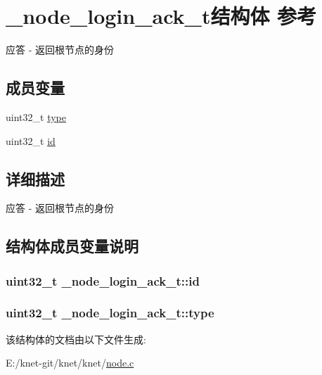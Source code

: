 \hypertarget{a00037}{}\section{\+\_\+node\+\_\+login\+\_\+ack\+\_\+t结构体 参考}
\label{a00037}


应答 -\/ 返回根节点的身份  


\subsection*{成员变量}
\begin{DoxyCompactItemize}
\item 
uint32\+\_\+t \hyperlink{a00037_aa36693af643bf1dfd76fd9192b84859d_aa36693af643bf1dfd76fd9192b84859d}{type}
\item 
uint32\+\_\+t \hyperlink{a00037_ad6b2a4f14df04a88e2b5f40978093056_ad6b2a4f14df04a88e2b5f40978093056}{id}
\end{DoxyCompactItemize}


\subsection{详细描述}
应答 -\/ 返回根节点的身份 

\subsection{结构体成员变量说明}
\hypertarget{a00037_ad6b2a4f14df04a88e2b5f40978093056_ad6b2a4f14df04a88e2b5f40978093056}{}
\subsubsection[{id}]{\setlength{\rightskip}{0pt plus 5cm}uint32\+\_\+t \+\_\+node\+\_\+login\+\_\+ack\+\_\+t\+::id}\label{a00037_ad6b2a4f14df04a88e2b5f40978093056_ad6b2a4f14df04a88e2b5f40978093056}
\hypertarget{a00037_aa36693af643bf1dfd76fd9192b84859d_aa36693af643bf1dfd76fd9192b84859d}{}
\subsubsection[{type}]{\setlength{\rightskip}{0pt plus 5cm}uint32\+\_\+t \+\_\+node\+\_\+login\+\_\+ack\+\_\+t\+::type}\label{a00037_aa36693af643bf1dfd76fd9192b84859d_aa36693af643bf1dfd76fd9192b84859d}


该结构体的文档由以下文件生成\+:\begin{DoxyCompactItemize}
\item 
E\+:/knet-\/git/knet/knet/\hyperlink{a00101}{node.\+c}\end{DoxyCompactItemize}
